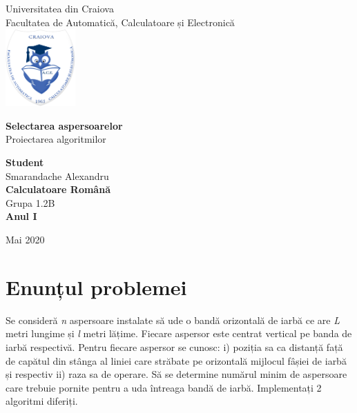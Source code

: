 \documentclass[14ppt]{article}
\begin{document}
\begin{titlepage}
    \begin{center}
    \Large
        Universitatea din Craiova\\
        Facultatea de Automatică, Calculatoare și Electronică\\
         \includegraphics[width=0.2\textwidth]{ace.png}
        \vspace*{2cm}
            
        \Huge{\textbf{Selectarea aspersoarelor}\\}
        \vspace{0.3cm}
        \Large
        Proiectarea algoritmilor
            
        \vspace{1.5cm}
            
        \Large \textbf{Student}\\ Smarandache Alexandru
        \\\vspace{0.25cm}
        \Large{\textbf{Calculatoare Română}}\\
        \Large{Grupa 1.2B}\\
         \Large{\textbf{Anul I}}\\
        \vfill
    
        \vspace{0.8cm}
            
        \Large
        Mai 2020
    \end{center}
\end{titlepage}

\section{Enunțul problemei}
 Se consideră \emph{n} aspersoare instalate să ude o bandă orizontală de iarbă ce are \emph{L} metri lungime și \emph{l} metri lățime. Fiecare aspersor este centrat vertical pe banda de iarbă respectivă. Pentru fiecare aspersor se cunosc: i) poziția sa ca distanță față de capătul din stânga al liniei care străbate pe orizontală mijlocul fâșiei de iarbă și respectiv ii) raza sa de operare. Să se determine numărul minim de aspersoare care trebuie pornite pentru a uda întreaga bandă de iarbă. Implementați 2 algoritmi diferiți. 
\end{document}
